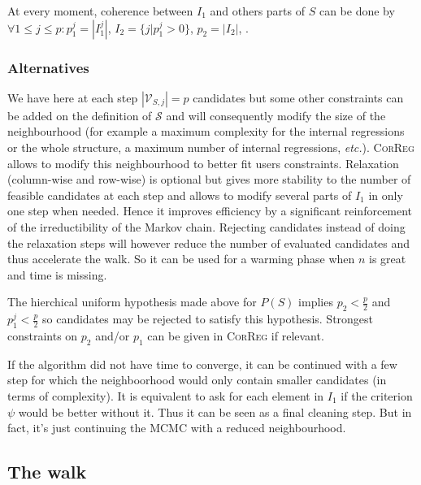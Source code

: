 \documentclass[11pt,a4paper]{article}
\begin{document}
	\smallskip
	At every moment, coherence between $I_1$ and others parts of $S$ can be done by $\forall 1\leq j\leq p :  p_1^j=|I_1^j|$, $I_2=\{j |p_1^j>0 \}$, $p_2= |I_2|$, .
		\subsubsection{Alternatives}
	We have here at each step $|\mathcal{V}_{S,j}|=p$ candidates but some other constraints can be added on the definition of $\mathcal{S}$ and will consequently modify the size of the neighbourhood (for example a maximum complexity for the internal regressions or the whole structure, a maximum number of internal regressions, {\it etc.}). \textsc{CorReg} allows to modify this neighbourhood to better fit users constraints. Relaxation (column-wise and row-wise) is optional but gives more stability to the number of feasible candidates at each step and allows to modify several parts of $I_1$ in only one step when needed. Hence it improves efficiency by a significant reinforcement of the irreductibility of the Markov chain. Rejecting candidates instead of doing the relaxation steps will  however reduce the number of evaluated candidates and thus accelerate the walk. So it can be used for a warming phase when $n$ is great and time is missing.
	
	The hierchical uniform hypothesis made above for $P(S)$ implies $p_2<\frac{p}{2}$ and $p_1^j<\frac{p}{2}$ so candidates may be rejected to satisfy this hypothesis. Strongest constraints on $p_2$ and/or $p_1$ can be given in \textsc{CorReg} if relevant.
	
If the algorithm did not have time to converge, it can be continued with a few step for which the neighboorhood would only contain smaller candidates (in terms of complexity). It is equivalent to ask for each element in $I_1$ if the criterion $\psi$ would be better without it. Thus it can be seen as a final cleaning step. But in fact, it's just continuing the MCMC with a reduced neighbourhood.	
	\subsection{The walk}
\end{document}
